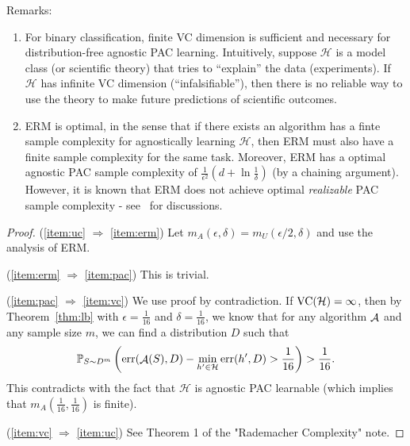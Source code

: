 \documentclass{article}
\DeclareMathOperator*{\err}{{\rm err}}
\DeclareMathOperator*{\Acal}{{\cal A}}
\DeclareMathOperator*{\VC}{{\rm VC}}
\newcommand{\PP}{\mathbb{P}}
\newcommand{\Hcal}{\mathcal{H}}
\begin{document}
Remarks:
\begin{enumerate}
  \item For binary classification, finite VC dimension is  sufficient and necessary for distribution-free agnostic PAC learning. Intuitively, suppose
$\Hcal$ is a model class (or scientific theory) that tries to ``explain'' the data (experiments). If $\Hcal$ has infinite VC dimension (``infalsifiable''), then there is no reliable way to use the theory to make future predictions of scientific outcomes.

  \item ERM is optimal, in the sense that if there exists an algorithm has a finte sample complexity for agnostically learning $\Hcal$, then ERM must also have a finite sample complexity for the same task. Moreover, ERM has a optimal agnostic PAC sample complexity of $\frac{1}{\epsilon^2}(d + \ln\frac{1}{\delta})$ (by a chaining argument). However, it is known that ERM does not achieve optimal {\em realizable} PAC sample complexity - see~\cite{simon2015almost, hanneke2016optimal} for discussions.

\end{enumerate}

\begin{proof}
(\ref{item:uc} $\Rightarrow$ \ref{item:erm}) Let $m_A(\epsilon, \delta) = m_U(\epsilon/2, \delta)$ and use the analysis of ERM.

(\ref{item:erm} $\Rightarrow$ \ref{item:pac}) This is trivial.

(\ref{item:pac} $\Rightarrow$ \ref{item:vc}) We use proof by contradiction.
If $\VC(\Hcal) = \infty$, then by Theorem~\ref{thm:lb} with $\epsilon = \frac 1 {16}$ and $\delta = \frac 1 {16}$, we know that for any algorithm $\Acal$ and any sample size $m$, we can find a distribution $D$ such that
\[ \PP_{S \sim D^m} \del{\err(\Acal(S), D) - \min_{h' \in \Hcal} \err(h', D) > \frac{1}{16}} > \frac{1}{16}. \]
This contradicts with the fact that $\Hcal$ is agnostic PAC learnable (which implies that
$m_A(\frac 1 {16}, \frac 1 {16})$ is finite).

(\ref{item:vc} $\Rightarrow$ \ref{item:uc}) See Theorem 1 of the "Rademacher Complexity" note.
\end{proof}




\end{document}
